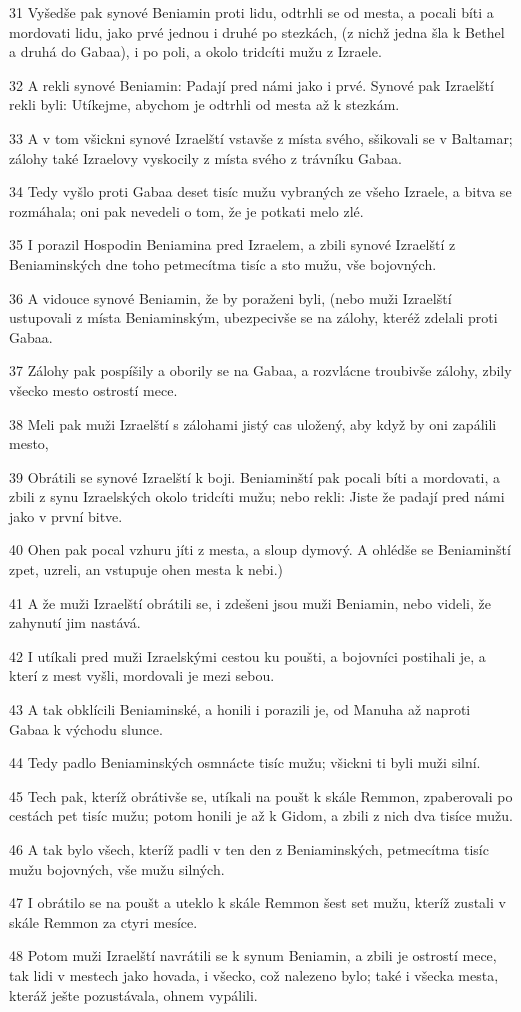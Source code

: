 \par 31 Vyšedše pak synové Beniamin proti lidu, odtrhli se od mesta, a pocali bíti a mordovati lidu, jako prvé jednou i druhé po stezkách, (z nichž jedna šla k Bethel a druhá do Gabaa), i po poli, a  okolo tridcíti mužu z Izraele.
\par 32 A rekli synové Beniamin: Padají pred námi jako i prvé. Synové pak Izraelští rekli byli: Utíkejme, abychom je odtrhli od mesta až k stezkám.
\par 33 A v tom všickni synové Izraelští vstavše z místa svého, sšikovali se v Baltamar; zálohy také Izraelovy vyskocily z místa svého z trávníku Gabaa.
\par 34 Tedy vyšlo proti Gabaa deset tisíc mužu vybraných ze všeho Izraele, a bitva se rozmáhala; oni pak nevedeli o tom, že je potkati melo zlé.
\par 35 I porazil Hospodin Beniamina pred Izraelem, a zbili synové Izraelští z Beniaminských dne toho petmecítma tisíc a sto mužu, vše bojovných.
\par 36 A vidouce synové Beniamin, že by poraženi byli, (nebo muži Izraelští ustupovali z místa Beniaminským, ubezpecivše se na zálohy, kteréž zdelali proti Gabaa.
\par 37 Zálohy pak pospíšily a oborily se na Gabaa, a rozvlácne troubivše zálohy, zbily všecko mesto ostrostí mece.
\par 38 Meli pak muži Izraelští s zálohami jistý cas uložený, aby když by oni zapálili mesto,
\par 39 Obrátili se synové Izraelští k boji. Beniaminští pak pocali bíti a mordovati, a zbili z synu Izraelských okolo tridcíti mužu; nebo rekli: Jiste že padají pred námi jako v první bitve.
\par 40 Ohen pak pocal vzhuru jíti z mesta, a sloup dymový. A ohlédše se Beniaminští zpet, uzreli, an vstupuje ohen mesta k nebi.)
\par 41 A že muži Izraelští obrátili se, i zdešeni jsou muži Beniamin, nebo videli, že zahynutí jim nastává.
\par 42 I utíkali pred muži Izraelskými cestou ku poušti, a bojovníci postihali je, a kterí z mest vyšli, mordovali je mezi sebou.
\par 43 A tak obklícili Beniaminské, a honili i porazili je, od Manuha až naproti Gabaa k východu slunce.
\par 44 Tedy padlo Beniaminských osmnácte tisíc mužu; všickni ti byli muži silní.
\par 45 Tech pak, kteríž obrátivše se, utíkali na poušt k skále Remmon, zpaberovali po cestách pet tisíc mužu; potom honili je až k Gidom, a zbili z nich dva tisíce mužu.
\par 46 A tak bylo všech, kteríž padli v ten den z Beniaminských, petmecítma tisíc mužu bojovných, vše mužu silných.
\par 47 I obrátilo se na poušt a uteklo k skále Remmon šest set mužu, kteríž zustali v skále Remmon za ctyri mesíce.
\par 48 Potom muži Izraelští navrátili se k synum Beniamin, a zbili je ostrostí mece, tak lidi v mestech jako hovada, i všecko, což nalezeno bylo; také i všecka mesta, kteráž ješte pozustávala, ohnem vypálili.

